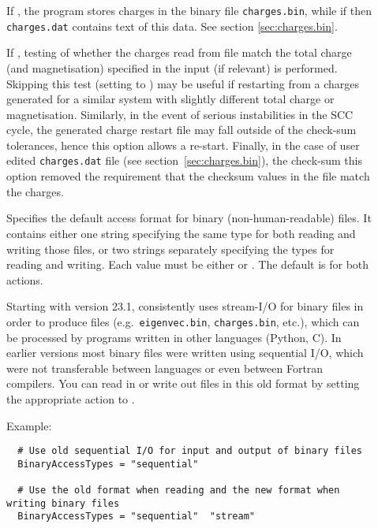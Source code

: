 \begin{description}
\item[] If , the program stores charges in the
  binary file \verb|charges.bin|, while if  then \verb|charges.dat|
  contains text of this data. See section \ref{sec:charges.bin}.

\item[] If , testing of whether the charges read from
  file match the total charge (and magnetisation) specified in the {\dftbp}
  input (if relevant) is performed. Skipping this test (setting to ) may
  be useful if restarting from a charges generated for a similar system with
  slightly different total charge or magnetisation. Similarly, in the event of
  serious instabilities in the SCC cycle, the generated charge restart file may
  fall outside of the check-sum tolerances, hence this option allows a
  re-start. Finally, in the case of user edited \verb|charges.dat| file (see
  section~\ref{sec:charges.bin}), the check-sum this option removed the
  requirement that the checksum values in the file match the charges.

\item[\label{sec:dftbp.Options.BinaryAccessTypes}]
  Specifies the default access format for binary (non-human-readable) files. It
  contains either one string specifying the same type for both reading and
  writing those files, or two strings separately specifying the types for
  reading and writing. Each value must be either  or
  . The default is  for both actions.

  Starting with version 23.1, \dftbp{} consistently uses stream-I/O for binary
  files in order to produce files (e.g.\ \verb|eigenvec.bin|,
  \verb|charges.bin|, etc.), which can be processed by programs written in other
  languages (Python, C). In earlier versions most binary files were written
  using sequential I/O, which were not transferable between languages or even
  between Fortran compilers. You can read in or write out files in this old
  format by setting the appropriate action to .

  Example:
\begin{verbatim}
  # Use old sequential I/O for input and output of binary files
  BinaryAccessTypes = "sequential"

  # Use the old format when reading and the new format when writing binary files
  BinaryAccessTypes = "sequential"  "stream"
\end{verbatim}


\end{description}
